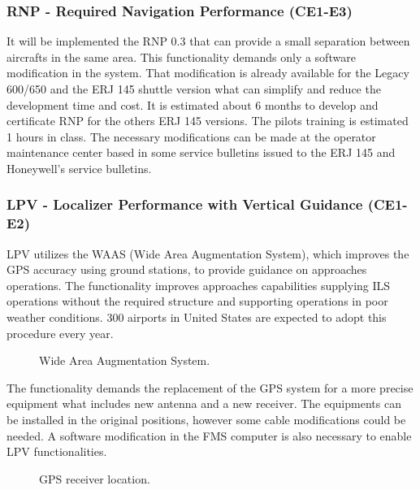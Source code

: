 \subsubsection{RNP - Required Navigation Performance (CE1-E3)}
It will be implemented the RNP 0.3 that can provide a small separation between aircrafts in the same area. This functionality demands only a software modification in the system. That modification is already available for the Legacy 600/650 and the ERJ 145 shuttle version what can simplify and reduce the development time and cost. It is estimated about 6 months to develop and certificate RNP for the others ERJ 145 versions. The pilots training is estimated 1 hours in class.  The necessary modifications can be made at the operator maintenance center based in some service bulletins issued to the ERJ 145 and Honeywell's service bulletins.

\subsubsection{LPV - Localizer Performance with Vertical Guidance (CE1-E2)}

LPV utilizes the WAAS (Wide Area Augmentation System), which improves the GPS accuracy using ground stations, to provide guidance on approaches operations. The functionality improves approaches capabilities supplying ILS operations without the required structure and supporting operations in poor weather conditions. 300 airports in United States are expected to adopt this procedure every year.

\begin{figure}[H] %
\caption{Wide Area Augmentation System.}
\label{fig:WideAreaAugmentationSystem}
\end{figure}

The functionality demands the replacement of the GPS system for a more precise equipment what includes new antenna and a new receiver. The equipments can be installed in the original positions, however some cable modifications could be needed. A software modification in the FMS computer is also necessary to enable LPV functionalities.

\begin{figure}[H] %
\caption{GPS receiver location.}
\label{fig:GPSReceiverLocation}
\end{figure}

